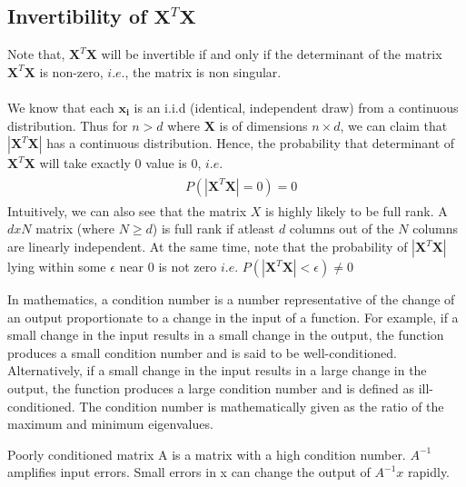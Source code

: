\documentclass[12pt]{article}
\begin{document}
\subsection{Invertibility of $\boldsymbol{X}^T\boldsymbol{X}$}
Note that, $\boldsymbol{X}^T\boldsymbol{X}$ will be invertible if and only if the determinant of the matrix $\boldsymbol{X}^T\boldsymbol{X}$ is non-zero, $i.e.$, the matrix is non singular.\\ \\
We know that each $\boldsymbol{x_i}$ is an i.i.d (identical, independent draw) from a continuous distribution. Thus for $n > d$ where $\boldsymbol{X}$ is of dimensions $n \times d$, we can claim that $|\boldsymbol{X}^T\boldsymbol{X}|$ has a continuous distribution. Hence, the probability that determinant of $\boldsymbol{X}^T\boldsymbol{X}$ will take exactly 0 value is 0, $i.e.$ 
\begin{gather}
    \begin{aligned}
        &  P(|\boldsymbol{X}^T\boldsymbol{X}| = 0) = 0           \nonumber
    \end{aligned}
\end{gather}
Intuitively, we can also see that the matrix $X$ is highly likely to be full rank. A $dxN$ matrix (where $N \ge d$) is full rank if atleast $d$ columns out of the $N$ columns are linearly independent.
At the same time, note that the probability of $|\boldsymbol{X}^T\boldsymbol{X}|$ lying within some $\epsilon$ near 0 is not zero $i.e.$ $P(|\boldsymbol{X}^T\boldsymbol{X}| < \epsilon) \neq 0$ 

In mathematics, a condition number is a number representative of the change of an output proportionate to a change in the input of a function. For example, if a small change in the input results in a small change in the output, the function produces a small condition number and is said to be well-conditioned. Alternatively, if a small change in the input results in a large change in the output, the function produces a large condition number and is defined as ill-conditioned. The condition number is mathematically given as the ratio of the maximum and minimum eigenvalues. 

Poorly conditioned matrix A is a matrix with a high condition number. $A^{-1}$ amplifies input errors. Small errors in x can change the output of $A^{-1}x$ rapidly. 
\end{document}
